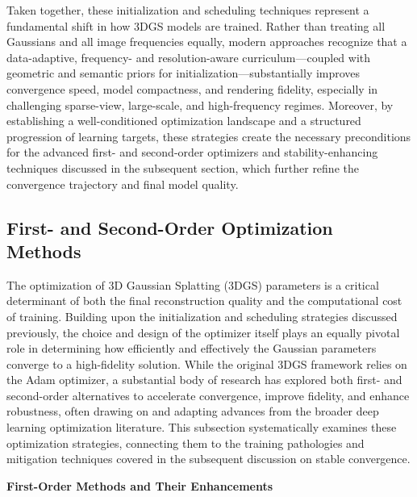 \documentclass[11pt]{article}
\begin{document}
Taken together, these initialization and scheduling techniques represent a fundamental shift in how 3DGS models are trained. Rather than treating all Gaussians and all image frequencies equally, modern approaches recognize that a data-adaptive, frequency- and resolution-aware curriculum---coupled with geometric and semantic priors for initialization---substantially improves convergence speed, model compactness, and rendering fidelity, especially in challenging sparse-view, large-scale, and high-frequency regimes. Moreover, by establishing a well-conditioned optimization landscape and a structured progression of learning targets, these strategies create the necessary preconditions for the advanced first- and second-order optimizers and stability-enhancing techniques discussed in the subsequent section, which further refine the convergence trajectory and final model quality.

\subsection{First- and Second-Order Optimization Methods}

The optimization of 3D Gaussian Splatting (3DGS) parameters is a critical determinant of both the final reconstruction quality and the computational cost of training. Building upon the initialization and scheduling strategies discussed previously, the choice and design of the optimizer itself plays an equally pivotal role in determining how efficiently and effectively the Gaussian parameters converge to a high-fidelity solution. While the original 3DGS framework relies on the Adam optimizer, a substantial body of research has explored both first- and second-order alternatives to accelerate convergence, improve fidelity, and enhance robustness, often drawing on and adapting advances from the broader deep learning optimization literature. This subsection systematically examines these optimization strategies, connecting them to the training pathologies and mitigation techniques covered in the subsequent discussion on stable convergence.

\textbf{First-Order Methods and Their Enhancements}
\end{document}
